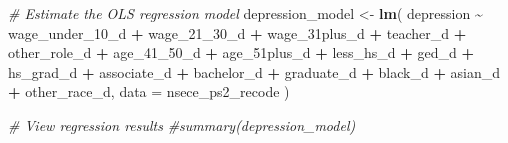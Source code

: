 \documentclass[
]{article}
\newenvironment{Shaded}{\begin{snugshade}}{\end{snugshade}}
\newcommand{\AttributeTok}[1]{\textcolor[rgb]{0.13,0.29,0.53}{#1}}
\newcommand{\CommentTok}[1]{\textcolor[rgb]{0.56,0.35,0.01}{\textit{#1}}}
\newcommand{\FunctionTok}[1]{\textcolor[rgb]{0.13,0.29,0.53}{\textbf{#1}}}
\newcommand{\NormalTok}[1]{#1}
\newcommand{\OtherTok}[1]{\textcolor[rgb]{0.56,0.35,0.01}{#1}}
\newcommand{\SpecialCharTok}[1]{\textcolor[rgb]{0.81,0.36,0.00}{\textbf{#1}}}
\begin{document}
\begin{Shaded}
\begin{Highlighting}[]
\CommentTok{\# Estimate the OLS regression model}
\NormalTok{depression\_model }\OtherTok{\textless{}{-}} \FunctionTok{lm}\NormalTok{(}
\NormalTok{  depression }\SpecialCharTok{\textasciitilde{}}
\NormalTok{    wage\_under\_10\_d }\SpecialCharTok{+}
\NormalTok{    wage\_21\_30\_d }\SpecialCharTok{+}
\NormalTok{    wage\_31plus\_d }\SpecialCharTok{+}
\NormalTok{    teacher\_d }\SpecialCharTok{+}
\NormalTok{    other\_role\_d }\SpecialCharTok{+}
\NormalTok{    age\_41\_50\_d }\SpecialCharTok{+}
\NormalTok{    age\_51plus\_d }\SpecialCharTok{+}
\NormalTok{    less\_hs\_d }\SpecialCharTok{+}
\NormalTok{    ged\_d }\SpecialCharTok{+}
\NormalTok{    hs\_grad\_d }\SpecialCharTok{+}
\NormalTok{    associate\_d }\SpecialCharTok{+}
\NormalTok{    bachelor\_d }\SpecialCharTok{+}
\NormalTok{    graduate\_d }\SpecialCharTok{+}
\NormalTok{    black\_d }\SpecialCharTok{+}
\NormalTok{    asian\_d }\SpecialCharTok{+}
\NormalTok{    other\_race\_d,}
  \AttributeTok{data =}\NormalTok{ nsece\_ps2\_recode}
\NormalTok{)}

\CommentTok{\# View regression results}
\CommentTok{\#summary(depression\_model)}


\end{Highlighting}
\end{Shaded}
\end{document}
